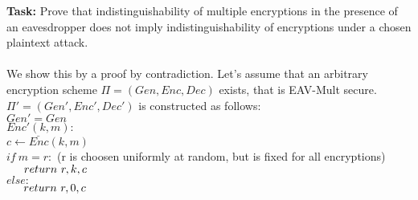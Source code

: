 \textbf{Task:} Prove that indistinguishability of multiple encryptions in the presence of an eavesdropper does
not imply indistinguishability of encryptions under a chosen plaintext attack.\\
\\
We show this by a proof by contradiction. Let's assume that an arbitrary encryption scheme \(\Pi = (Gen, Enc, Dec)\) exists, that is EAV-Mult secure.\\
\(\Pi' = (Gen', Enc', Dec')\) is constructed as follows:\\
\(Gen' = Gen\)\\
\(\underline{Enc'(k, m)}:\)\\
\(c \leftarrow Enc(k, m)\)\\
\(if\ m = r:\) (r is choosen uniformly at random, but is fixed for all encryptions)\\
\(\indent return\ r,k,c\)\\
\(else:\)\\
\(\indent return\ r,0,c\)\\


